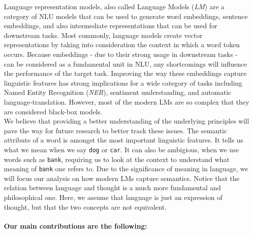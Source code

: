 \documentclass[a4paper,12pt,oneside,openright]{report}
\begin{document}
Language representation models, also called Language Models (\textit{LM}) are a category of NLU models that can be used to generate word embeddings, sentence embeddings, and also intermediate representations that can be used for downstream tasks.
Most commonly, language models create vector representations by taking into consideration the context in which a word token occurs. 
Because embeddings - due to their strong usage in downstream tasks - can be considered as a fundamental unit in NLU, any shortcomings will influence the performance of the target task.
Improving the way these embeddings capture linguistic features has strong implications for a wide category of tasks including Named Entity Recognition (\textit{NER}), sentiment understanding, and automatic language-translation. 
However, most of the modern LMs are so complex that they are considered black-box models.
\\

We believe that providing a better understanding of the underlying principles will pave the way for future research to better track these issues.
The semantic attribute of a word is amongst the most important linguistic features.
It tells us what we mean when we say \texttt{dog} or \texttt{car}.
It can also be ambigious, when we use words such as \texttt{bank}, requiring us to look at the context to understand what meaning of \texttt{bank} one refers to.
Due to the significance of meaning in language, we will focus our analysis on how modern LMs capture semantics. 
Notice that the relation between language and thought is a much more fundamental and philosophical one.
Here, we assume that language is just an expression of thought, but that the two concepts are not equivalent.

\paragraph{Our main contributions are the following:}
\end{document}
